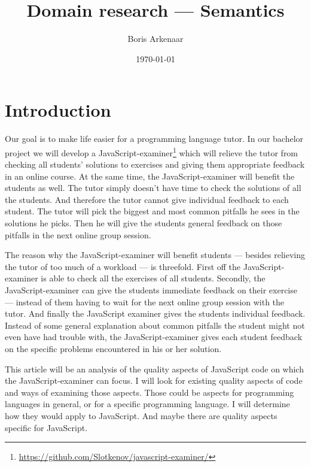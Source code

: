 \documentclass{article}
\begin{document}
 

\title{Domain research --- Semantics}
\author{Boris Arkenaar}
\date{\today}
\maketitle 


\section{Introduction} 

Our goal is to make life easier for a programming language tutor. In our
bachelor project we will develop a
JavaScript-examiner\footnote{\url{https://github.com/Slotkenov/javascript-examiner/}}
which will relieve the tutor from checking all students' solutions to exercises
and giving them appropriate feedback in an online course. At the same time, the
JavaScript-examiner will benefit the students as well. The tutor simply doesn't
have time to check the solutions of all the students. And therefore the tutor
cannot give individual feedback to each student. The tutor will pick the
biggest and most common pitfalls he sees in the solutions he picks. Then he
will give the students general feedback on those pitfalls in the next online
group session.

The reason why the JavaScript-examiner will benefit students --- besides
relieving the tutor of too much of a workload --- is threefold.  First off
the JavaScript-examiner is able to check all the exercises of all
students. Secondly, the JavaScript-examiner can give the students immediate
feedback on their exercise --- instead of them having to wait for the next
online group session with the tutor. And finally the JavaScript examiner
gives the students individual feedback. Instead of some general explanation
about common pitfalls the student might not even have had trouble with, the
JavaScript-examiner gives each student feedback on the specific problems
encountered in his or her solution.

This article will be an analysis of the quality aspects of JavaScript code on
which the JavaScript-examiner can focus. I will look for existing quality
aspects of code and ways of examining those aspects. Those could be aspects for
programming languages in general, or for a specific programming language. I
will determine how they would apply to JavaScript. And maybe there are quality
aspects specific for JavaScript.
\end{document}
